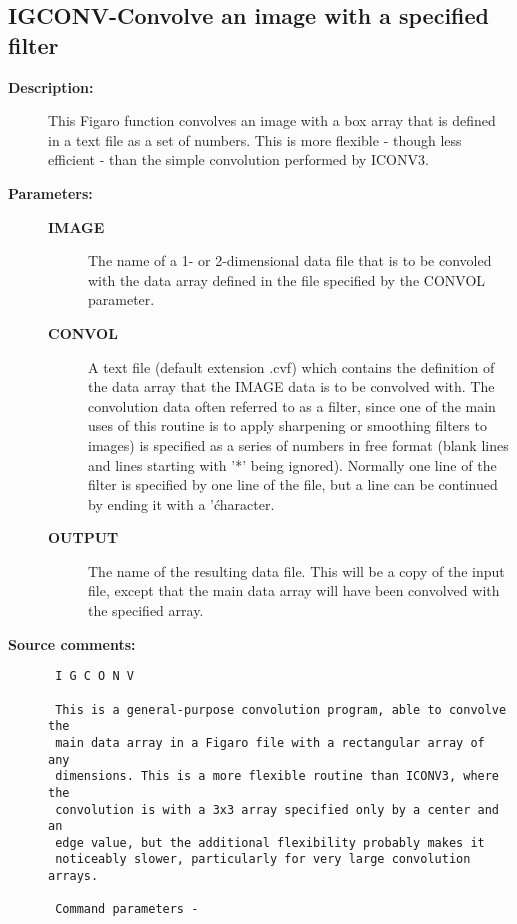 \subsection{IGCONV-\label{IGCONV}Convolve an image with a specified filter}
\begin{description}

\item [{\bf Description:}]
 This Figaro function convolves an image with a box array that
 is defined in a text file as a set of numbers.  This is more
 flexible - though less efficient - than the simple convolution
 performed by ICONV3.

\item [{\bf Parameters:}]
\begin{description}
\item [{\bf IMAGE}]
 The name of a 1- or 2-dimensional data file that
 is to be convoled with the data array defined
 in the file specified by the CONVOL parameter.
\item [{\bf CONVOL}]
 A text file (default extension .cvf)
 which contains the definition of the data array that the
 IMAGE data is to be convolved with. The convolution data
 often referred to as a filter, since one of the main uses
 of this routine is to apply sharpening or smoothing filters
 to images) is specified as a series of numbers in free
 format (blank lines and lines starting with '*' being
 ignored). Normally one line of the filter is specified by
 one line of the file, but a line can be continued by
 ending it with a '\' character.
\item [{\bf OUTPUT}]
 The name of the resulting data file.  This will be
 a copy of the input file, except that the main data
 array will have been convolved with the specified array.
\end{description}

\item [{\bf Source comments:}]
\begin{verbatim}
 I G C O N V

 This is a general-purpose convolution program, able to convolve the
 main data array in a Figaro file with a rectangular array of any
 dimensions. This is a more flexible routine than ICONV3, where the
 convolution is with a 3x3 array specified only by a center and an
 edge value, but the additional flexibility probably makes it
 noticeably slower, particularly for very large convolution arrays.

 Command parameters -


\end{verbatim}
\end{description}
